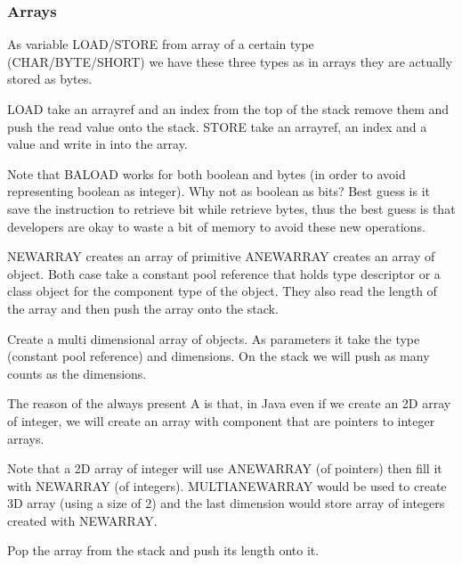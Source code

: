 \subsubsection{Arrays}
\theoremstyle{definition}
\begin{definition}
    As variable LOAD/STORE from array of a certain type (CHAR/BYTE/SHORT) we
    have these three types as in arrays they are actually stored as bytes.

    LOAD take an arrayref and an index from the top of the stack remove them and
    push the read value onto the stack.
    STORE take an arrayref, an index and a value and write in into the array.

    Note that BALOAD works for both boolean and bytes (in order to avoid
    representing boolean as integer). Why not as boolean as bits? Best guess is
    it save the instruction to retrieve bit while retrieve bytes, thus the best
    guess is that developers are okay to waste a bit of memory to avoid these
    new operations. 
\end{definition}
\theoremstyle{definition}
\begin{definition}[NEWARRAY] [A]NEWARRAY creates an array of primitive ANEWARRAY
    creates an array of object. Both case take a constant pool reference that
    holds type descriptor or a class object for the component type of the
    object. They also read the length of the array and then push the array onto
    the stack.
\end{definition}
\theoremstyle{definition}
\begin{definition}[MULTIANEWARRAY]
    Create a multi dimensional array of objects. As parameters it take the type
    (constant pool reference) and dimensions. On the stack we will push as many
    counts as the dimensions.

    The reason of the always present A is that, in Java even if we create an 2D
    array of integer, we will create an array with component that are pointers
    to integer arrays.
\end{definition}
Note that a 2D array of integer will use ANEWARRAY (of pointers) then fill it
with NEWARRAY (of integers). MULTIANEWARRAY would be used to create 3D array
(using a size of 2) and the last dimension would store array of integers created
with NEWARRAY.
\theoremstyle{definition}
\begin{definition}[ARRAYLENGTH]
    Pop the array from the stack and push its length onto it.
\end{definition}

